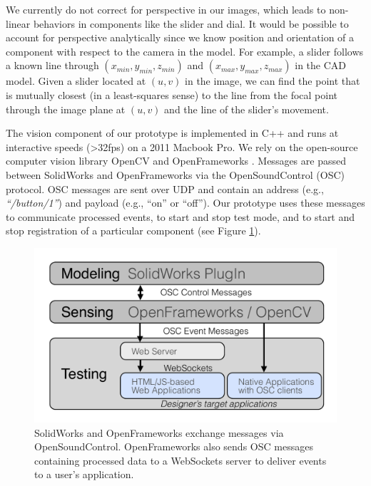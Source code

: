 We currently do not correct for perspective in our images, which leads to non-linear behaviors in components like the slider and dial. It would be possible to account for perspective analytically since we know position and orientation of a component with respect to the camera in the model. For example, a slider follows a known line through $(x_{min}, y_{min},z_{min})$ and $(x_{max},y_{max},z_{max})$ in the CAD model.
Given a slider located at $(u,v)$ in the image, we can find the point that is mutually closest (in a least-squares sense) to the line from the focal point through the image plane at $(u,v)$ and the line of the slider's movement.

The vision component of our prototype is implemented in C++ and runs at interactive speeds (\textgreater 32fps) on a 2011 Macbook Pro. We rely on the open-source computer vision library OpenCV \cite{opencv} and OpenFrameworks \cite{openframeworks}.
Messages are passed between SolidWorks and OpenFrameworks via the OpenSoundControl (OSC) protocol. OSC messages are sent over UDP and contain an address (e.g., {\em ``/button/1''}) and payload (e.g., ``on'' or ``off''). Our prototype uses these messages to communicate processed events, to start and stop test mode, and to start and stop registration of a particular component (see Figure \ref{fig:sauron-arch}).

\begin{figure}
\centering
\includegraphics[width=\textwidth]{figures/sauron/arch2outlined.pdf}
\caption{SolidWorks and OpenFrameworks exchange messages via OpenSoundControl. OpenFrameworks also sends OSC messages containing processed data to a WebSockets server to deliver events to a user's application.}
\label{fig:sauron-arch}
\end{figure}

